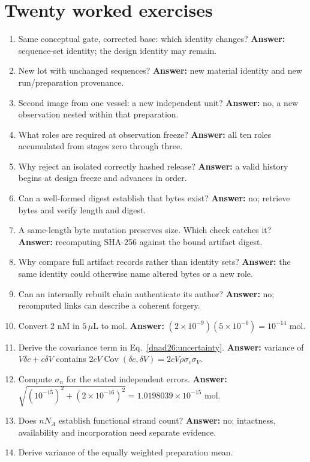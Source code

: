 \section{Twenty worked exercises}
\begin{enumerate}
\item Same conceptual gate, corrected base: which identity changes?
\textbf{Answer:} sequence-set identity; the design identity may remain.
\item New lot with unchanged sequences?
\textbf{Answer:} new material identity and new run/preparation provenance.
\item Second image from one vessel: a new independent unit?
\textbf{Answer:} no, a new observation nested within that preparation.
\item What roles are required at observation freeze?
\textbf{Answer:} all ten roles accumulated from stages zero through three.
\item Why reject an isolated correctly hashed release?
\textbf{Answer:} a valid history begins at design freeze and advances in order.
\item Can a well-formed digest establish that bytes exist?
\textbf{Answer:} no; retrieve bytes and verify length and digest.
\item A same-length byte mutation preserves size. Which check catches it?
\textbf{Answer:} recomputing SHA-256 against the bound artifact digest.
\item Why compare full artifact records rather than identity sets?
\textbf{Answer:} the same identity could otherwise name altered bytes or a new role.
\item Can an internally rebuilt chain authenticate its author?
\textbf{Answer:} no; recomputed links can describe a coherent forgery.
\item Convert 2 nM in $5\,\mu$L to mol.
\textbf{Answer:} $(2\times10^{-9})(5\times10^{-6})=10^{-14}$ mol.
\item Derive the covariance term in Eq.~\ref{dnad26:uncertainty}.
\textbf{Answer:} variance of $V\delta c+c\delta V$ contains
$2cV\operatorname{Cov}(\delta c,\delta V)=2cV\rho\sigma_c\sigma_V$.
\item Compute $\sigma_n$ for the stated independent errors.
\textbf{Answer:} $\sqrt{(10^{-15})^2+(2\times10^{-16})^2}
=1.0198039\times10^{-15}$ mol.
\item Does $nN_A$ establish functional strand count?
\textbf{Answer:} no; intactness, availability and incorporation need separate evidence.
\item Derive variance of the equally weighted preparation mean.

\end{enumerate}
